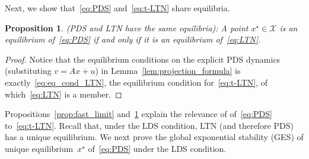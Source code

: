 \documentclass[letterpaper, conference]{ieeeconf}
\newcommand{\X}{\mathcal X}
\newtheorem{proposition}[theorem]{Proposition}
\newcommand{\longthmtitle}[1]{\mbox{}{\textit{(#1):}}}
\newcommand{\1}{\mathbf{1}}
\begin{document}
Next, we show that~\eqref{eq:PDS} and~\eqref{eq:t-LTN} share equilibria.
\begin{proposition}\longthmtitle{PDS and LTN have the same equilibria}
\label{prop:PDS_LTN_same_eq}
A point \(x^\star\in\X\) is an equilibrium of~\eqref{eq:PDS} if and only if it is an equilibrium of~\eqref{eq:LTN}.
\end{proposition}
\begin{proof}
Notice that the equilibrium conditions on the explicit PDS dynamics (substituting \(v = Ax + u\)) in Lemma~\ref{lem:projection_formula} is exactly~\eqref{eq:eq_cond_LTN}, the equilibrium condition for~\eqref{eq:t-LTN}, of which~\eqref{eq:LTN} is a member.
\end{proof}

Propositions~\ref{prop:fast_limit} and~\ref{prop:PDS_LTN_same_eq} explain the relevance of 
of~\eqref{eq:PDS} to~\eqref{eq:t-LTN}.
Recall that,  under the LDS condition,  LTN (and therefore PDS) has a unique equilibrium.
We next prove the global exponential stability (GES) of unique equilibrium~\(x^\star\) of~\eqref{eq:PDS} under the LDS condition.
\end{document}
